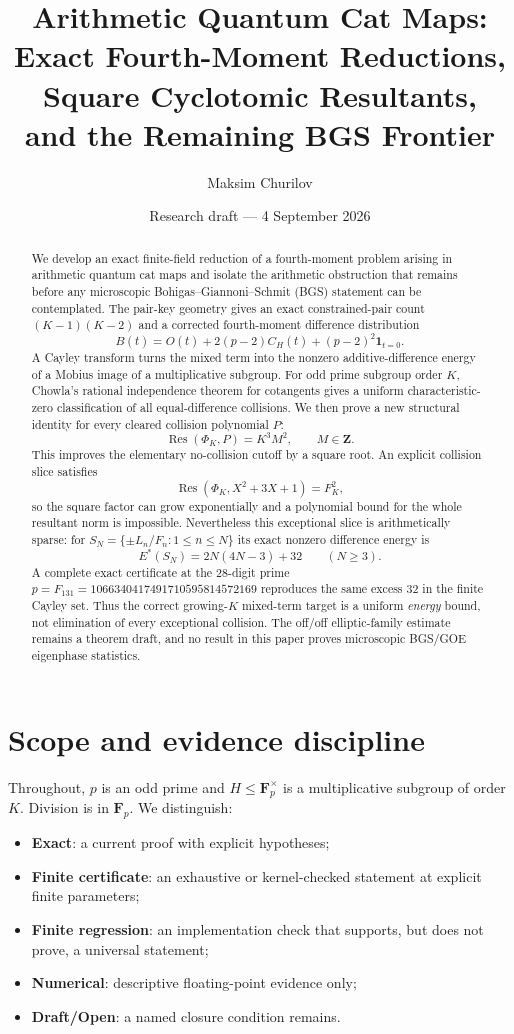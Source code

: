 \documentclass[11pt]{article}
\title{\textbf{Arithmetic Quantum Cat Maps:}\\
Exact Fourth-Moment Reductions, Square Cyclotomic Resultants,\\
and the Remaining BGS Frontier}
\author{Maksim Churilov}
\date{Research draft --- 4 September 2026}
\newcommand{\Fp}{\mathbf F_p}
\newcommand{\Res}{\operatorname{Res}}
\begin{document}
\maketitle

\begin{abstract}
We develop an exact finite-field reduction of a fourth-moment problem arising
in arithmetic quantum cat maps and isolate the arithmetic obstruction that
remains before any microscopic Bohigas--Giannoni--Schmit (BGS) statement can
be contemplated.  The pair-key geometry gives an exact constrained-pair count
$(K-1)(K-2)$ and a corrected fourth-moment difference distribution
\[
B(t)=O(t)+2(p-2)C_H(t)+(p-2)^2\mathbf 1_{t=0}.
\]
A Cayley transform turns the mixed term into the nonzero additive-difference
energy of a Mobius image of a multiplicative subgroup.  For odd prime subgroup
order $K$, Chowla's rational independence theorem for cotangents gives a
uniform characteristic-zero classification of all equal-difference
collisions.  We then prove a new structural identity for every cleared
collision polynomial $P$:
\[
\Res(\Phi_K,P)=K^3M^2,\qquad M\in\mathbf Z.
\]
This improves the elementary no-collision cutoff by a square root.  An explicit
collision slice satisfies
\[
\Res(\Phi_K,X^2+3X+1)=F_K^2,
\]
so the square factor can grow exponentially and a polynomial bound for the
whole resultant norm is impossible.  Nevertheless this exceptional slice is
arithmetically sparse: for
$S_N=\{\pm L_n/F_n:1\le n\le N\}$ its exact nonzero difference energy is
\[
E^*(S_N)=2N(4N-3)+32\qquad(N\ge3).
\]
A complete exact certificate at the 28-digit prime
$p=F_{131}=1066340417491710595814572169$ reproduces the same excess $32$ in the
finite Cayley set.  Thus the correct growing-$K$ mixed-term target is a uniform
\emph{energy} bound, not elimination of every exceptional collision.  The
off/off elliptic-family estimate remains a theorem draft, and no result in
this paper proves microscopic BGS/GOE eigenphase statistics.
\end{abstract}

\section{Scope and evidence discipline}

Throughout, $p$ is an odd prime and $H\le \Fp^\times$ is a multiplicative
subgroup of order $K$.  Division is in $\Fp$.  We distinguish:
\begin{itemize}
\item \textbf{Exact}: a current proof with explicit hypotheses;
\item \textbf{Finite certificate}: an exhaustive or kernel-checked statement
      at explicit finite parameters;
\item \textbf{Finite regression}: an implementation check that supports, but
      does not prove, a universal statement;
\item \textbf{Numerical}: descriptive floating-point evidence only;
\item \textbf{Draft/Open}: a named closure condition remains.
\end{itemize}
\end{document}
